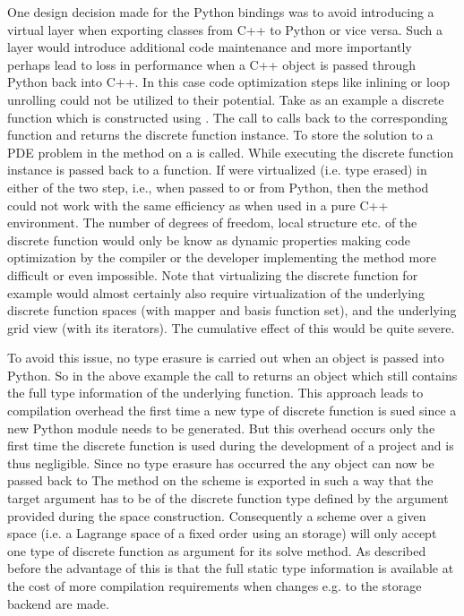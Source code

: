 
One design decision made for the \dune Python bindings was to avoid
introducing a virtual layer when exporting classes from C++ to Python or
vice versa. Such a layer would introduce additional code maintenance
and more importantly perhaps lead to loss in performance when a C++ object
is passed through Python back into C++. In this case code optimization
steps like inlining or loop unrolling could not be utilized to their
potential. Take as an example a discrete function which is constructed
using . The call to
 calls back to the corresponding \dune[fem] function and
returns the discrete function instance. To store the solution to a PDE
problem in  the  method on a  is 
called. While executing  the discrete
function instance is passed back to a \dune[fem] function. If 
were virtualized (i.e. type erased) in either of the two step, i.e., when
passed to or from Python, then the  method could not work with
the same efficiency as when used in a pure C++ environment. The number of
degrees of freedom, local structure etc. of the discrete function would
only be know as dynamic properties making code optimization by the compiler
or the \dune developer implementing the  method more difficult
or even impossible. Note that virtualizing the discrete function for
example would almost certainly also require virtualization of the
underlying discrete function spaces (with mapper and basis function set),
and the underlying grid view (with its iterators). The cumulative effect
of this would be quite severe.

To avoid this issue, no type erasure is carried out
when an object is passed into Python. So in the above example the call to
 returns an object which still contains the full type
information of the underlying \dune[fem] function. This approach leads to
compilation overhead the first time a new type of discrete function is sued
since a new Python module needs to be generated. But this overhead occurs only
the first time the discrete function is used during the development of a
project and is thus negligible. Since no type erasure has occurred the
any \dune object can now be passed back to The  method on the scheme is 
exported in such a way that the target argument has to be of the discrete
function type defined by the  argument provided during the
space construction. Consequently a scheme over a given space (i.e. a
Lagrange space of a fixed order using an  storage)
will only accept one type of discrete function as  argument
for its solve method. As described before the advantage of this is that the
full static type information is available at the cost of more compilation
requirements when changes e.g. to the storage backend are made.


